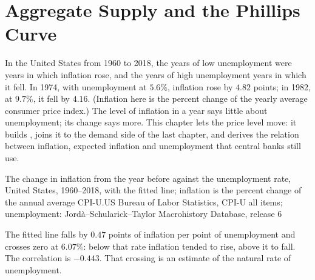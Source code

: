 \chapter{Aggregate Supply and the Phillips Curve}\label{ch:b1:aggregate-supply}

In the United States from 1960 to 2018, the years of low unemployment were
years in which inflation rose, and the years of high unemployment years in
which it fell. In 1974, with unemployment at $5.6\%$, inflation rose by $4.82$
points; in 1982, at $9.7\%$, it fell by $4.16$. %
(Inflation here is the percent change of the yearly average consumer price
index.)
The level of inflation in a year says little about unemployment; its
change says more. This chapter lets the price level move: it builds
, joins it to the demand side of the last chapter, and
derives the relation between inflation, expected inflation and
unemployment that central banks still use.

\begin{openingchart}{The change in inflation from the year before against the
unemployment rate, United States, 1960--2018, with the fitted line;
inflation is the percent change of the annual average CPI-U.}{US Bureau of
Labor Statistics, CPI-U all items; unemployment: Jord\`a--Schularick--Taylor
Macrohistory Database, release 6}
\end{openingchart}

The fitted line falls by $0.47$ points of inflation per point of
unemployment and crosses zero at $6.07\%$: below that rate inflation tended
to rise, above it to fall. The correlation is $-0.443$. %
That crossing is an estimate of the natural rate of unemployment.

